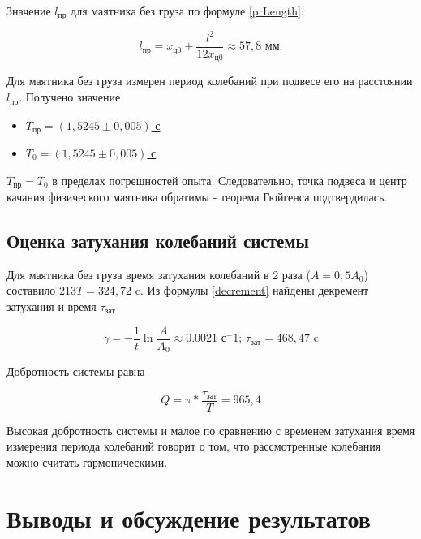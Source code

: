 \documentclass[a4paper,12pt]{article} %
\begin{document}
Значение $ l_\text{пр} $ для маятника без груза по формуле \eqref{prLength}:

\begin{equation}
l_\text{пр}=x_\text{ц0}+\frac{l^2}{12x_\text{ц0}}\approx 57,8 \text{ мм}.
\end{equation}

Для маятника без груза измерен период колебаний при подвесе его на расстоянии $ l_\text{пр} $. Получено значение
\begin{itemize}
	\item \underline{$ T_\text{пр} = \left( 1,5245\pm0,005 \right) $ с}
	\item \underline{$ T_0 = \left( 1,5245\pm0,005 \right) $ с}
\end{itemize}
$ T_{\text{пр}} = T_0 $ в пределах погрешностей опыта. Следовательно, точка подвеса и центр качания физического маятника обратимы - теорема Гюйгенса подтвердилась.

\subsection{Оценка затухания колебаний системы}

Для маятника без груза время затухания колебаний в 2 раза ($ A = 0,5A_0$) составило $ 213T = 324,72 $ c. Из формулы \eqref{decrement} найдены декремент затухания и время $ \tau_\text{зат}$

\begin{equation}
    \gamma=-\frac{1}{t}\ln{\frac{A}{A_0}} \approx 0.0021 \text{ с}^-1 \text{;   } \tau_\text{зат} = 468,47 \text{ c}  
\end{equation}

Добротность системы равна

\begin{equation}
    Q = \pi*\frac{\tau_\text{зат}}{T} = 965,4
\end{equation}

Высокая добротность системы и малое по сравнению с временем затухания время  измерения периода колебаний говорит о том, что рассмотренные колебания можно считать гармоническими.

\section{Выводы и обсуждение результатов}
\end{document}
